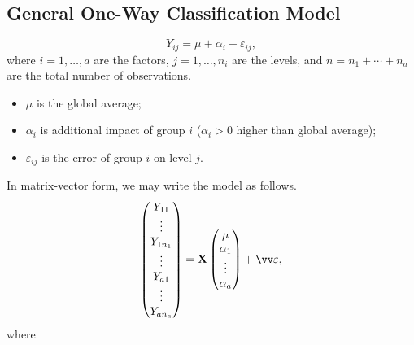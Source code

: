 \subsection*{General One-Way Classification Model}
\[ Y_{ij}=\mu+\alpha_i+\varepsilon_{ij}, \]
where $ i=1,\ldots,a $ are the factors, $ j=1,\ldots,n_i $ are the levels,
and $ n=n_1+\cdots+n_a $ are the total number of observations.
\begin{itemize}
    \item $ \mu $ is the global average;
    \item $ \alpha_i $ is additional impact of group $ i $ ($ \alpha_i>0 $ higher than global average);
    \item $ \varepsilon_{ij} $ is the error of group $ i $ on level $ j $.
\end{itemize}
In matrix-vector form, we may write the model as follows.
\[ \begin{pmatrix}
        Y_{11}   \\
        \vdots   \\
        Y_{1n_1} \\
        \vdots   \\
        Y_{a1}   \\
        \vdots   \\
        Y_{an_a}
    \end{pmatrix}=\Matrix{X}\begin{pmatrix}
        \mu      \\
        \alpha_1 \\
        \vdots   \\
        \alpha_a
    \end{pmatrix}+\Vector{\varepsilon}, \]
where
